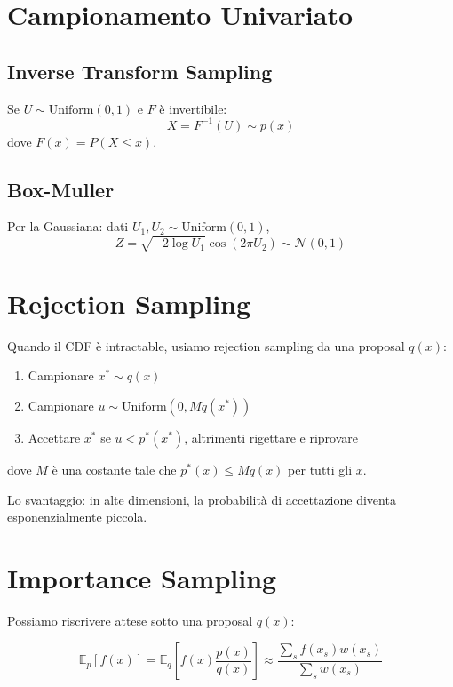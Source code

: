 \section{Campionamento Univariato}

\subsection{Inverse Transform Sampling}

Se $U \sim \text{Uniform}(0,1)$ e $F$ è invertibile:
\[X = F^{-1}(U) \sim p(x)\]
dove $F(x) = P(X \leq x)$.

\subsection{Box-Muller}

Per la Gaussiana: dati $U_1, U_2 \sim \text{Uniform}(0,1)$,
\[Z = \sqrt{-2\log U_1} \cos(2\pi U_2) \sim \mathcal{N}(0,1)\]

\section{Rejection Sampling}

Quando il CDF è intractable, usiamo rejection sampling da una proposal $q(x)$:

\begin{theorem}
  \begin{enumerate}
    \item Campionare $x^* \sim q(x)$
    \item Campionare $u \sim \text{Uniform}(0, Mq(x^*))$
    \item Accettare $x^*$ se $u < p^*(x^*)$, altrimenti rigettare e riprovare
  \end{enumerate}
  dove $M$ è una costante tale che $p^*(x) \leq Mq(x)$ per tutti gli $x$.
\end{theorem}

Lo svantaggio: in alte dimensioni, la probabilità di accettazione diventa esponenzialmente piccola.

\section{Importance Sampling}

Possiamo riscrivere attese sotto una proposal $q(x)$:

\[\mathbb{E}_p[f(x)] = \mathbb{E}_q\left[f(x) \frac{p(x)}{q(x)}\right] \approx \frac{\sum_s f(x_s) w(x_s)}{\sum_s w(x_s)}\]

